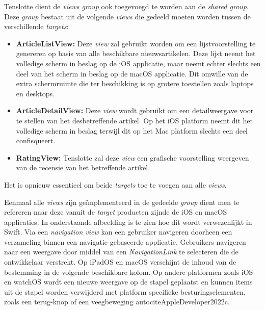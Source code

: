 Tenslotte dient de \textit{views group} ook toegevoegd te worden aan de \textit{shared group}. Deze \textit{group} bestaat uit de volgende \textit{views} die gedeeld moeten worden tussen de verschillende \textit{targets}:

\begin{itemize}
    \item \textbf{ArticleListView:} Deze \textit{view} zal gebruikt worden om een lijstvoorstelling te genereren op basis van alle beschikbare nieuwsartikelen. Deze lijst neemt het volledige scherm in beslag op de iOS applicatie, maar neemt echter slechts een deel van het scherm in beslag op de macOS applicatie. Dit omwille van de extra schermruimte die ter beschikking is op grotere toestellen zoals laptops en desktops.
    \item \textbf{ArticleDetailView:} Deze \textit{view} wordt gebruikt om een detailweergave voor te stellen van het desbetreffende artikel. Op het iOS platform neemt dit het volledige scherm in beslag terwijl dit op het Mac platform slechts een deel confisqueert. 
    \item \textbf{RatingView:} Tenslotte zal deze \textit{view} een grafische voorstelling weergeven van de recensie van het betreffende artikel. 
\end{itemize}

Het is opnieuw essentieel om beide \textit{targets} toe te voegen aan alle \textit{views}.

\pagebreak
Eenmaal alle \textit{views} zijn geïmplementeerd in de gedeelde \textit{group} dient men te refereren naar deze vanuit de \textit{target} producten zijnde de iOS en macOS applicaties. In onderstaande afbeelding is te zien hoe dit wordt verwezenlijkt in Swift. Via een \textit{navigation view} kan een gebruiker navigeren doorheen een verzameling binnen een navigatie-gebaseerde applicatie. Gebruikers navigeren naar een weergave door middel van een \textit{NavigationLink} te selecteren die de ontwikkelaar verstrekt. Op iPadOS en macOS verschijnt de inhoud van de bestemming in de volgende beschikbare kolom. Op andere platformen zoals iOS en watchOS wordt een nieuwe weergave op de stapel geplaatst en kunnen items uit de stapel worden verwijderd met platform specifieke besturingselementen, zoals een terug-knop of een veegbeweging autocite{AppleDeveloper2022c}.

